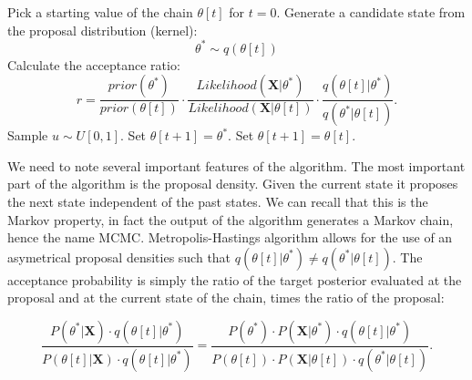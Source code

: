 \begin{algorithm}[H]
\centering
\begin{algorithmic}[1]
%
\State Pick a starting value of the chain $\theta \left[ t \right]$ for $t=0$.
%
%
\State Generate a candidate state from the proposal distribution (kernel):
$$\theta^{*} \sim q(\theta[t])$$
%
\State Calculate the acceptance ratio:
$$r=\frac{prior\left(\theta^{*}\right)}{prior\left(\theta\left[t\right]\right)}\cdot\frac{Likelihood\left(\mathbf{X}|\theta^{*}\right)}{Likelihood\left(\mathbf{X}|\theta\left[t\right]\right)}\cdot\frac{q\left(\theta\left[t\right]|\theta^{*}\right)}{q\left(\theta^{*}|\theta\left[t\right]\right)}.$$
%
\State Sample $u\sim U[0,1]$.
%
%
\State Set $\theta[t+1]=\theta^*.$
%
\Else 
%
\State Set $\theta[t+1]=\theta[t].$
%
\EndIf
%
\EndFor
\end{algorithmic}
\caption{
{ \footnotesize 
{\bf Metropolis-Hastings algorithm} 
}%
}
\label{alg:metropolisHastings}
\end{algorithm}

We need to note several important features of the algorithm.
The most important part of the algorithm is the proposal density. 
Given the current state it proposes the next state independent of the past states.
We can recall that this is the Markov property, in fact the output of the algorithm generates a Markov chain, hence the name MCMC.
Metropolis-Hastings algorithm allows for the use of an asymetrical proposal densities such that $q\left(\theta\left[t\right]|\theta^{*}\right)\neq q\left(\theta^{*}|\theta\left[t\right]\right)$.
The acceptance probability is simply the ratio of the target posterior evaluated at the proposal and at the current state of the chain, times the ratio of the proposal: 

\begin{equation}
\frac{P\left(\theta^{*}|\mathbf{X}\right)\cdot q\left(\theta\left[t\right]|\theta^{*}\right)}{P\left(\theta\left[t\right]|\mathbf{X}\right)\cdot q\left(\theta\left[t\right]|\theta^{*}\right)}=\frac{P(\theta^{*})\cdot P\left(\mathbf{X}|\theta^{*}\right)\cdot q\left(\theta\left[t\right]|\theta^{*}\right)}{P(\theta\left[t\right])\cdot P\left(\mathbf{X}|\theta\left[t\right]\right)\cdot q\left(\theta^{*}|\theta\left[t\right]\right)}.
\label{eq:metropolis1}
\end{equation}

